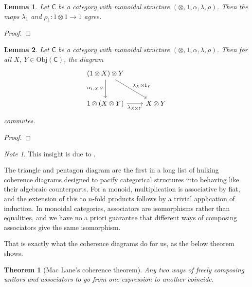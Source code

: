 \documentclass[a4paper]{report}
\newcommand{\Obj}{\mathrm{Obj}}
\theoremstyle{definition}
\theoremstyle{plain}
\newtheorem{theorem}{Theorem}[section]
\newtheorem{lemma}{Lemma}[section]
\theoremstyle{remark}
\newtheorem{note}{Note}[section]
\begin{document}
\begin{lemma}
  \label{lemma:leftandrightunitoragreewhenpossible}
  Let $\mathsf{C}$ be a category with monoidal structure $(\otimes, 1, \alpha, \lambda, \rho)$. Then the maps $\lambda_{1}$ and $\rho_{1}\colon 1 \otimes 1 \to 1$ agree.
\end{lemma}
\begin{proof}

\end{proof}

\begin{lemma}
  Let $\mathsf{C}$ be a category with monoidal structure $(\otimes, 1, \alpha, \lambda, \rho)$. Then for all $X$, $Y \in \Obj(\mathsf{C})$, the diagram
  \begin{equation*}
    \begin{tikzcd}[row sep=large]
      (1 \otimes X) \otimes Y 
      \arrow[d, swap, "{\alpha_{1, X, Y}}"]
      \arrow[dr, "\lambda_{X} \otimes 1_{Y}"]
      & 
      \\
      1 \otimes (X \otimes Y)
      \arrow[r, swap, "\lambda_{X \otimes Y}"]
      & X \otimes Y
    \end{tikzcd}
  \end{equation*}
  commutes.
\end{lemma}
\begin{proof}

\end{proof}

\begin{note}
  This insight is due to \cite{unapolagetic-mathematician-mac-lanes-theorem}.

  The triangle and pentagon diagram are the first in a long list of hulking coherence diagrams designed to pacify categorical structures into behaving like their algebraic counterparts. For a monoid, multiplication is associative by fiat, and the extension of this to $n$-fold products follows by a trivial application of induction. In monoidal categories, associators are isomorphisms rather than equalities, and we have no a priori guarantee that different ways of composing associators give the same isomorphism. 

  That is exactly what the coherence diagrams do for us, as the below theorem shows.
\end{note}

\begin{theorem}[Mac Lane's coherence theorem]
  Any two ways of freely composing unitors and associators to go from one expression to another coincide.
\end{theorem}
\end{document}
